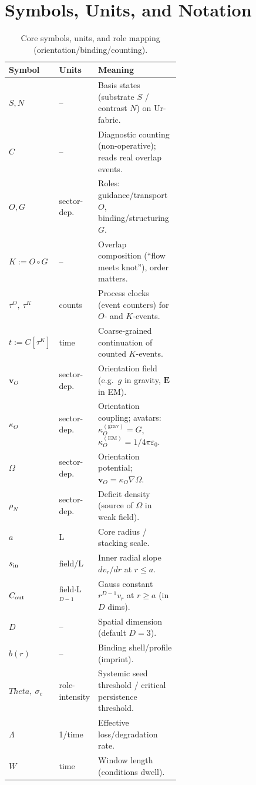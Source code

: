 \documentclass[12pt,a4paper,oneside]{scrreprt}
\def\Theta{Theta}%
\begin{document}
\chapter{Symbols, Units, and Notation}\label{app:symbols}
\begin{table}[htbp]\centering
\caption{Core symbols, units, and role mapping (orientation/binding/counting).}
\begin{tabular}{llp{0.58\linewidth}}\toprule
Symbol & Units & Meaning \\ \midrule
$S,N$ & – & Basis states (substrate $S$ / contrast $N$) on Ur-fabric.\\
$C$ & – & Diagnostic counting (non-operative); reads real overlap events.\\
$O,G$ & sector-dep. & Roles: guidance/transport $O$, binding/structuring $G$.\\
$K:=O\!\circ G$ & – & Overlap composition (“flow meets knot”), order matters.\\
$\tau^O,\ \tau^K$ & counts & Process clocks (event counters) for $O$- and $K$-events.\\
$t:=C[\tau^K]$ & time & Coarse-grained continuation of counted $K$-events.\\
$\mathbf v_O$ & sector-dep. & Orientation field (e.g.\ $g$ in gravity, $\mathbf E$ in EM).\\
$\kappa_O$ & sector-dep. & Orientation coupling; avatars: $\kappa_O^{(\mathrm{grav})}=G$, $\kappa_O^{(\mathrm{EM})}=1/4\pi\varepsilon_0$.\\
$\Omega$ & sector-dep. & Orientation potential; $\mathbf v_O=\kappa_O\nabla\Omega$.\\
$\rho_N$ & sector-dep. & Deficit density (source of $\Omega$ in weak field).\\
$a$ & L & Core radius / stacking scale.\\
$s_{\rm in}$ & field/L & Inner radial slope $dv_r/dr$ at $r\le a$.\\
$C_{\rm out}$ & field$\cdot$L$^{D-1}$ & Gauss constant $r^{D-1}v_r$ at $r\ge a$ (in $D$ dims).\\
$D$ & – & Spatial dimension (default $D=3$).\\
$b(r)$ & – & Binding shell/profile (imprint).\\
$\Theta,\ \sigma_c$ & role-intensity & Systemic seed threshold / critical persistence threshold.\\
$\Lambda$ & 1/time & Effective loss/degradation rate.\\
$W$ & time & Window length (conditions dwell).\\

\end{tabular}
\end{table}
\end{document}
